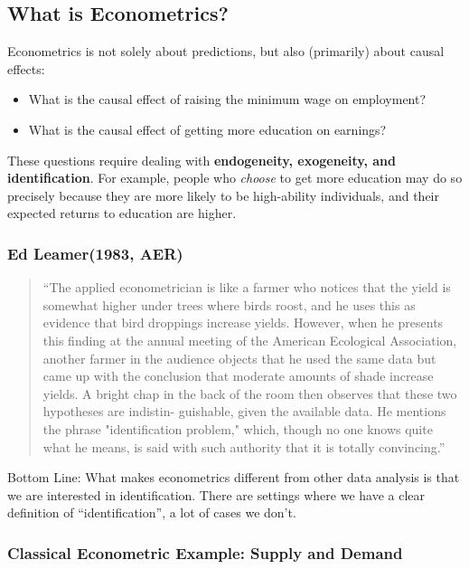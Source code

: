 \subsection{What is Econometrics?}

Econometrics is not solely about predictions, but also (primarily) about causal effects:

\begin{itemize}
    \item What is the causal effect of raising the minimum wage on employment?
    \item What is the causal effect of getting more education on earnings?
\end{itemize}

These questions require dealing with \textbf{endogeneity, exogeneity, and identification}.
For example, people who \textit{choose} to get more education may do so precisely because they are more likely to be high-ability individuals, and their expected returns to education are higher.

\subsubsection{Ed Leamer(1983, AER)}

\begin{quote}
    ``The applied econometrician is like a farmer who notices that the yield is
    somewhat higher under trees where birds roost, and he uses this as evidence
    that bird droppings increase yields. However, when he presents this finding at
    the annual meeting of the American Ecological Association, another farmer
    in the audience objects that he used the same data but came up with the
    conclusion that moderate amounts of shade increase yields. A bright chap in
    the back of the room then observes that these two hypotheses are indistin-
    guishable, given the available data. He mentions the phrase "identification
    problem," which, though no one knows quite what he means, is said with
    such authority that it is totally convincing.''
\end{quote}

Bottom Line: What makes econometrics different from other data analysis is that we are interested in identification. There are settings where we have a clear definition of ``identification'', a lot of cases we don't.


\subsubsection{Classical Econometric Example: Supply and Demand}

